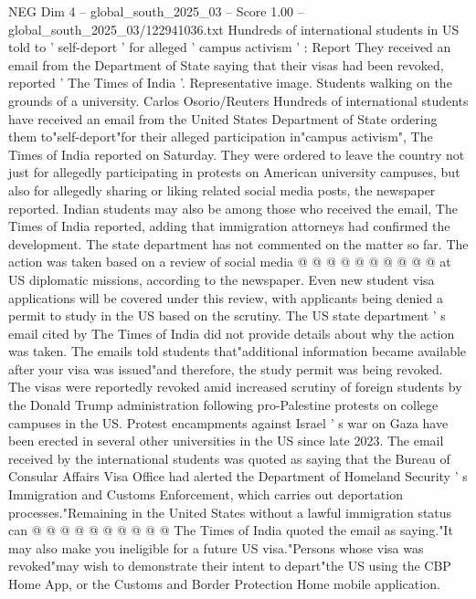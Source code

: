 \begin{textsample}{NEG Dim 4 – global\_south\_2025\_03 – Score 1.00 – global\_south\_2025\_03/122941036.txt}  \label{ex:f4_neg_428}
Hundreds of international students in US told to ' self-deport ' for alleged ' campus activism ' : Report They received an email from the Department of State saying that their visas had been revoked, reported ' The Times of India '.
Representative image.
Students walking on the grounds of a university.
Carlos Osorio/Reuters Hundreds of international students have received an email from the United States Department of State ordering them to"self-deport"for their alleged participation in"campus activism", The Times of India reported on Saturday.
They were ordered to leave the country not just for allegedly participating in protests on American university campuses, but also for allegedly sharing or liking related social media posts, the newspaper reported.
Indian students may also be among those who received the email, The Times of India reported, adding that immigration attorneys had confirmed the development.
The state department has not commented on the matter so far.
The action was taken based on a review of social media @ @ @ @ @ @ @ @ @ @ at US diplomatic missions, according to the newspaper.
Even new student visa applications will be covered under this review, with applicants being denied a permit to study in the US based on the scrutiny.
The US state department ' s email cited by The Times of India did not provide details about why the action was taken.
The emails told students that"additional information became available after your visa was issued"and therefore, the study permit was being revoked.
The visas were reportedly revoked amid increased scrutiny of foreign students by the Donald Trump administration following pro-Palestine protests on college campuses in the US.
Protest encampments against Israel ' s war on Gaza have been erected in several other universities in the US since late 2023.
The email received by the international students was quoted as saying that the Bureau of Consular Affairs Visa Office had alerted the Department of Homeland Security ' s Immigration and Customs Enforcement, which carries out deportation processes."Remaining in the United States without a lawful immigration status can @ @ @ @ @ @ @ @ @ @ The Times of India quoted the email as saying."It may also make you ineligible for a future US visa."Persons whose visa was revoked"may wish to demonstrate their intent to depart"the US using the CBP Home App, or the Customs and Border Protection Home mobile application.

\end{textsample}
